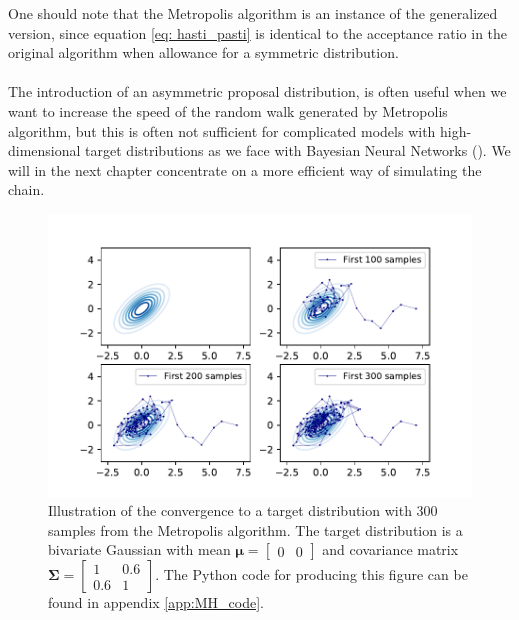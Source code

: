 One should note that the Metropolis algorithm is an instance of the generalized version, since equation \ref{eq: hasti_pasti} is identical to the acceptance ratio in the original algorithm when allowance for a symmetric distribution. \\
\\
The introduction of an asymmetric proposal distribution, is often useful when we want to increase the speed of the random walk generated by Metropolis algorithm, but this is often not sufficient for complicated models with high-dimensional target distributions as we face with Bayesian Neural Networks (\cite{gelmanbda04}). We will in the next chapter concentrate on a more efficient way of simulating the chain.
\begin{figure}
    \centering
    \includegraphics[width=\textwidth, height=\textheight, keepaspectratio]{pics/mh_randomWalk_behavior.pdf}
    \caption{Illustration of the convergence to a target distribution with 300 samples from the Metropolis algorithm. The target distribution is a bivariate Gaussian with mean 
        $\boldsymbol{\mu}= \begin{bmatrix}
            0 & 0
            \end{bmatrix}$ and covariance matrix
            $\boldsymbol{\Sigma}= 
            \begin{bmatrix}
                1 & 0.6\\
                0.6 & 1   
            \end{bmatrix}$. The Python code for producing this figure can be found in appendix \ref{app:MH_code}.
    }
    \label{fig:MH_sampling}
\end{figure}
\clearpage

